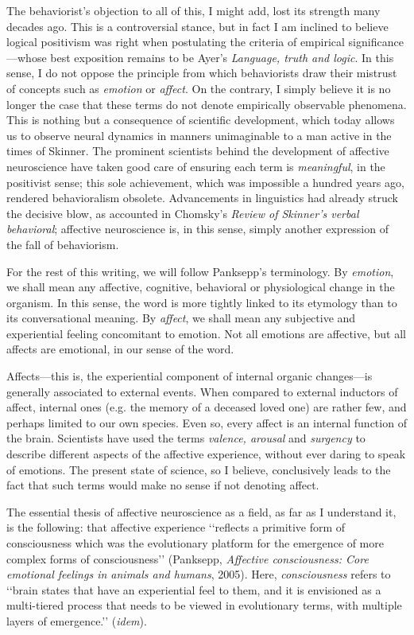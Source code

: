 \documentclass[a4paper]{article}
\begin{document}
The behaviorist's objection to all of this, I might add, lost its strength many
decades ago. This is a controversial stance, but in fact I am inclined to
believe logical positivism was right when postulating the criteria of empirical
significance---whose best exposition remains to be Ayer's \textit{Language,
truth and logic}. In this sense, I do not oppose the principle from which
behaviorists draw their mistrust of concepts such as \textit{emotion} or
\textit{affect}. On the contrary, I simply believe it is no longer the case that
these terms do not denote empirically observable phenomena. This is nothing but
a consequence of scientific development, which today allows us to observe neural
dynamics in manners unimaginable to a man active in the times of Skinner. The
prominent scientists behind the development of affective neuroscience have taken
good care of ensuring each term is \textit{meaningful}, in the positivist sense;
this sole achievement, which was impossible a hundred years ago, rendered
behavioralism obsolete. Advancements in linguistics had already struck the
decisive blow, as accounted in Chomsky's \textit{Review of Skinner's verbal
behavioral}; affective neuroscience is, in this sense, simply another expression
of the fall of behaviorism.

For the rest of this writing, we will follow Panksepp's terminology. By
\textit{emotion}, we shall mean any affective, cognitive, behavioral or
physiological change in the organism. In this sense, the word is more tightly
linked to its etymology than to its conversational meaning. By \textit{affect},
we shall mean any subjective and experiential feeling concomitant to emotion.
Not all emotions are affective, but all affects are emotional, in our sense of
the word.

Affects---this is, the experiential component of internal organic changes---is
generally associated to external events. When compared to external inductors of
affect, internal ones (e.g. the memory of a deceased loved one) are rather few,
and perhaps limited to our own species. Even so, every affect is an internal
function of the brain. Scientists have used the terms \textit{valence, arousal}
and \textit{surgency} to describe different aspects of the affective experience,
without ever daring to speak of emotions. The present state of science, so I
believe, conclusively leads to the fact that such terms would make no sense if
not denoting affect.

The essential thesis of affective neuroscience as a field, as far as I
understand it, is the following: that affective experience \lq\lq reflects a
primitive form of consciousness which was the evolutionary platform for the
emergence of more complex forms of consciousness\rq\rq{} (Panksepp,
\textit{Affective consciousness: Core emotional feelings in animals and humans},
2005). Here, \textit{consciousness} refers to \lq\lq brain states that have an
experiential feel to them, and it is envisioned as a multi-tiered process that
needs to be viewed in evolutionary terms, with multiple layers of
emergence.\rq\rq{} (\textit{idem}). 
\end{document}
